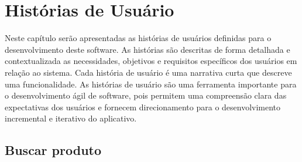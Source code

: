 \chapter{Histórias de Usuário} \label{cha:historiasUsuário}

Neste capítulo serão apresentadas as histórias de usuários definidas para o desenvolvimento deste software. As histórias são descritas de forma detalhada e contextualizada as necessidades, objetivos e requisitos específicos dos usuários em relação ao sistema. Cada história de usuário é uma narrativa curta que descreve uma funcionalidade. As histórias de usuário são uma ferramenta importante para o desenvolvimento ágil de software, pois permitem uma compreensão clara das expectativas dos usuários e fornecem direcionamento para o desenvolvimento incremental e iterativo do aplicativo.

\section{Buscar produto}%

\setcounter{numhistoria}{1}
\newcommand{\nhist}{%
  \padzeroes[2]{\decimal{numhistoria}}%
  \stepcounter{numhistoria}%
}

